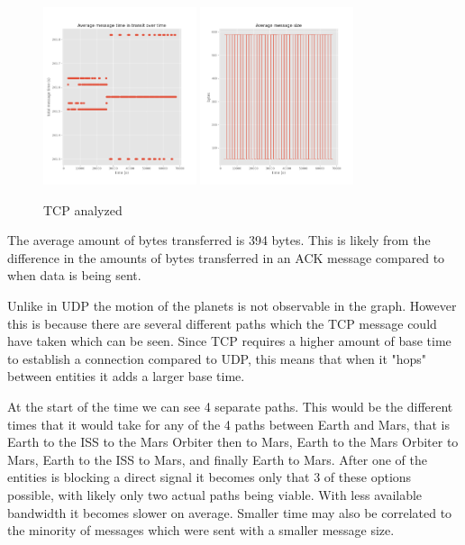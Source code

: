 \documentclass[a4paper,12pt]{article}
\begin{document}
\begin{figure}[h]
  \centering
  \includegraphics[width=0.4\textwidth]{media/tcp.png}
  \includegraphics[width=0.4\textwidth]{media/tcp_data.png}
  \caption{TCP analyzed}
\end{figure}

The average amount of bytes transferred is 394 bytes. This is likely from 
the difference in the amounts of bytes transferred in an ACK message compared 
to when data is being sent.



Unlike in UDP the motion of the planets is not observable in the graph. However this is 
because there are several different paths which the TCP message could have taken which can be seen. 
Since TCP requires a higher amount of base time to establish a connection compared to UDP, this 
means that when it "hops" between entities it adds a larger base time. 

At the start of the time we can see 4 separate paths. This would be the different times that it would take 
for any of the 4 paths between Earth and Mars, that is Earth to the ISS to the Mars Orbiter then to Mars,
Earth to the Mars Orbiter to Mars, Earth to the ISS to Mars, and finally Earth to Mars. After one of the 
entities is blocking a direct signal it becomes only that 3 of these options possible, with likely only two actual 
paths being viable. With less available 
bandwidth it becomes slower on average. Smaller time may also be correlated to the minority of messages which were
sent with a smaller message size. 
\end{document}
